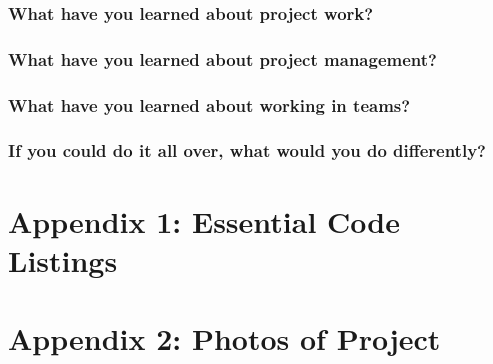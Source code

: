 \documentclass[onecolumn, draftclsnofoot,10pt, compsoc]{IEEEtran}
\begin{document}
\subsubsection{What have you learned about project work?}

\subsubsection{What have you learned about project management?}

\subsubsection{What have you learned about working in teams?}

\subsubsection{If you could do it all over, what would you do differently?}


\newpage
\section{Appendix 1: Essential Code Listings}

\newpage
\section{Appendix 2: Photos of Project}


\newpage
\nocite{*}


\end{document}

